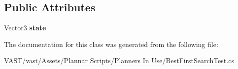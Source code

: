 \subsection*{Public Attributes}
\begin{DoxyCompactItemize}
\item 
\hypertarget{class_best_first_state_af66fca05a46c3dfc43168d25eb609abb}{Vector3 {\bfseries state}}\label{class_best_first_state_af66fca05a46c3dfc43168d25eb609abb}

\end{DoxyCompactItemize}


The documentation for this class was generated from the following file\-:\begin{DoxyCompactItemize}
\item 
V\-A\-S\-T/vast/\-Assets/\-Plannar Scripts/\-Planners In Use/Best\-First\-Search\-Test.\-cs\end{DoxyCompactItemize}
